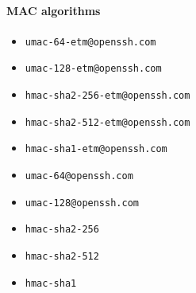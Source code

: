 \documentclass[sigconf,nonacm]{acmart}
\begin{document}
\begin{multicols}{2}
\paragraph{MAC algorithms}

\begin{itemize}
    \item \texttt{umac-64-etm@openssh.com}
    \item \texttt{umac-128-etm@openssh.com}
    \item \texttt{hmac-sha2-256-etm@openssh.com}
    \item \texttt{hmac-sha2-512-etm@openssh.com}
    \item \texttt{hmac-sha1-etm@openssh.com}
    \item \texttt{umac-64@openssh.com}
    \item \texttt{umac-128@openssh.com}
    \item \texttt{hmac-sha2-256}
    \item \texttt{hmac-sha2-512}
    \item \texttt{hmac-sha1}
\end{itemize}

\end{multicols}
\end{document}

